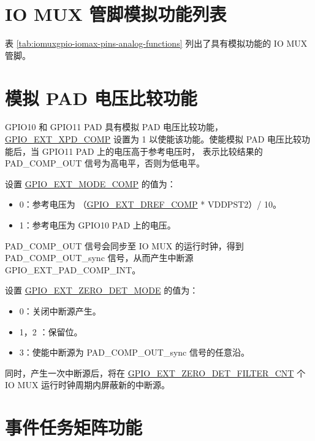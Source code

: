 \documentclass[main\_\_CN.tex]{subfiles}
\begin{document}


\section{IO MUX 管脚模拟功能列表}
\label{sec:iomux_pins}

表 \ref{tab:iomuxgpio-iomax-pins-analog-functions} 列出了具有模拟功能的 IO MUX 管脚。



\section{模拟 PAD 电压比较功能}
\label{sec:zcd_pads}


GPIO10 和 GPIO11 PAD 具有模拟 PAD 电压比较功能，\hyperref[fielddesc:GPIOSDXPDCOMP]{GPIO\_EXT\_XPD\_COMP} 设置为 1 以使能该功能。使能模拟 PAD 电压比较功能后，当 GPIO11 PAD 上的电压高于参考电压时， 表示比较结果的 PAD\_COMP\_OUT 信号为高电平，否则为低电平。

设置 \hyperref[fielddesc:GPIOSDMODECOMP]{GPIO\_EXT\_MODE\_COMP} 的值为：
\begin{itemize}
    \item 0：参考电压为 （{\hyperref[fielddesc:GPIOSDDREFCOMP]{GPIO\_EXT\_DREF\_COMP} * VDDPST2）/ 10}。
    \item 1：参考电压为 GPIO10 PAD 上的电压。
\end{itemize}

PAD\_COMP\_OUT 信号会同步至 IO MUX 的运行时钟，得到 PAD\_COMP\_OUT\_sync 信号，从而产生中断源 GPIO\_EXT\_PAD\_COMP\_INT。

设置 \hyperref[fielddesc:GPIOSDZERODETMODE]{GPIO\_EXT\_ZERO\_DET\_MODE} 的值为：

\begin{itemize}
    \item 0：关闭中断源产生。
    \item 1，2 ：保留位。
    \item 3：使能中断源为 PAD\_COMP\_OUT\_sync 信号的任意沿。
\end{itemize}

同时，产生一次中断源后，将在 \hyperref[fielddesc:GPIOSDZERODETFILTERCNT]{GPIO\_EXT\_ZERO\_DET\_FILTER\_CNT} 个 IO MUX 运行时钟周期内屏蔽新的中断源。

\section{事件任务矩阵功能}
\end{document}

